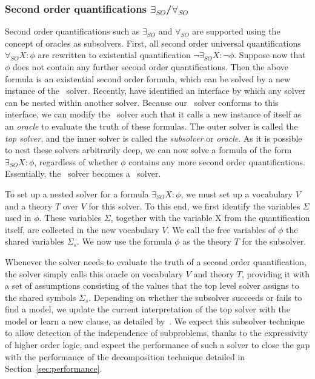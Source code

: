 \subsubsection{Second order quantifications $\exists_{SO}$/$\forall_{SO}$}
Second order quantifications such as $\exists_{SO}$ and $\forall_{SO}$ are supported using the concept of oracles as subsolvers.
First, all second order universal quantifications $\forall_{SO} X : \phi$ are rewritten to existential quantification $\neg \exists_{SO} X : \neg \phi$.
Suppose now that $\phi$ does not contain any further second order quantifications.
Then the above formula is an existential second order formula, which can be solved by a new instance of the \NP\ solver.
Recently, \cite{AAAIW1612603} have identified an interface by which any solver can be nested within another solver.
Because our \NP\ solver conforms to this interface, we can modify the \NP\ solver such that it calls a new instance of itself as an \emph{oracle} to evaluate the truth of these formulas.
The outer solver is called the \emph{top solver}, and the inner solver is called the \emph{subsolver} or \emph{oracle}.
As it is possible to nest these solvers arbitrarily deep, we can now solve a formula of the form $\exists_{SO} X : \phi$, regardless of whether $\phi$ contains any more second order quantifications.
Essentially, the \NP\ solver becomes a \QBF\ solver.

To set up a nested solver for a formula $\exists_{SO} X : \phi$, we must set up a vocabulary $V$ and a theory $T$ over $V$ for this solver. 
To this end, we first identify the variables $\Sigma$ used in $\phi$.
These variables $\Sigma$, together with the variable X from the quantification itself, are collected in the new vocabulary $V$. 
We call the free variables of $\phi$ the shared variables $\Sigma_s$.
We now use the formula $\phi$ as the theory $T$ for the subsolver.

Whenever the solver needs to evaluate the truth of a second order quantification, the solver simply calls this oracle on vocabulary $V$ and theory $T$, providing it with a set of assumptions consisting of the values that the top level solver assigns to the shared symbols $\Sigma_s$.
Depending on whether the subsolver succeeds or fails to find a model, we update the current interpretation of the top solver with the model or learn a new clause, as detailed by~\cite{AAAIW1612603}.
We expect this subsolver technique to allow detection of the independence of subproblems, thanks to the expressivity of higher order logic, and expect the performance of such a solver to close the gap with the performance of the decomposition technique detailed in Section~\ref{sec:performance}.

